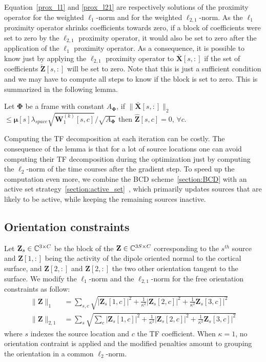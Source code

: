 Equation~\eqref{prox_l1} and \eqref{prox_l21} are respectively solutions of the proximity operator for the weighted $\ell_1$-norm and for the weighted $\ell_{2,1}$-norm. As the $\ell_1$ proximity operator shrinks coefficients towards zero, if a block of coefficients were set to zero by the $\ell_{2,1}$ proximity operator, it would also be set to zero after the application of the $\ell_1$ proximity operator. As a consequence, it is possible to know just by applying the $\ell_{2,1}$ proximity operator to $\bar{\mathbf{X}}[s,:]$ if the set of coefficients $\tilde{\mathbf{Z}}[s,:]$ will be set to zero. Note that this is just a sufficient condition and we may have to compute all steps to know if the block is set to zero. This is summarized in the following lemma.

\begin{lemma}
    Let $\mathbf{\Phi}$ be a frame with constant $A_{\mathbf{\Phi}}$, if $\|\bar{\mathbf{X}}[s,:]\|_2$ $\leq \mathbf{\mu}[s]\lambda_{space}\sqrt{\mathbf{W}_1^{(k)}[s,c]} / \sqrt{A_{\mathbf{\Phi}}}$ then $\hat{\mathbf{Z}}[s,c] = 0$, $\forall c$.
\end{lemma}

Computing the TF decomposition at each iteration can be costly. The consequence of the lemma is that for a lot of source locations one can avoid computing their TF decomposition during the optimization just by computing the $\ell_{2}$-norm of the time courses after the gradient step.
To speed up the computation even more, we combine the BCD scheme~\ref{section:BCD} with an active set strategy~\ref{section:active_set}~\cite{friedman2010regularization}, which primarily updates sources that are likely to be active, while keeping the remaining sources inactive.

\subsection*{Orientation constraints}
Let $\mathbf{Z}_s\in\mathbb{C}^{3\times C}$ be the block of the $\mathbf{Z}\in\mathbb{C}^{3S\times C}$	corresponding to the $s^{th}$ source and $\mathbf{Z}[1,:]$ being the activity of the dipole oriented normal to the cortical surface, and $\mathbf{Z}[2,:]$ and $\mathbf{Z}[2,:]$ the two other orientation tangent to the surface. We modify the $\ell_1$-norm and the $\ell_{2,1}$-norm for the free orientation constraints as follow:
\begin{align*}
\|\mathbf{Z}\|_1 &= \sum_{s,c}\sqrt{|\mathbf{Z}_s[1,c]|^2 + \frac{1}{\kappa^2}|\mathbf{Z}_s[2,c]|^2 + \frac{1}{\kappa^2}\mathbf{Z}_s[3,c]|^2} \\
\|\mathbf{Z}\|_{2,1} &= \sum_s\sqrt{\sum_c |\mathbf{Z}_s[1,c]|^2 + \frac{1}{\kappa^2}|\mathbf{Z}_s[2,c]|^2 + \frac{1}{\kappa^2}\mathbf{Z}_s[3,c]|^2}
\end{align*}
where $s$ indexes the source location and $c$ the TF coefficient. When $\kappa=1$, no orientation contraint is applied and the modified penalties amount to grouping the orientation in a common $\ell_2$-norm.

